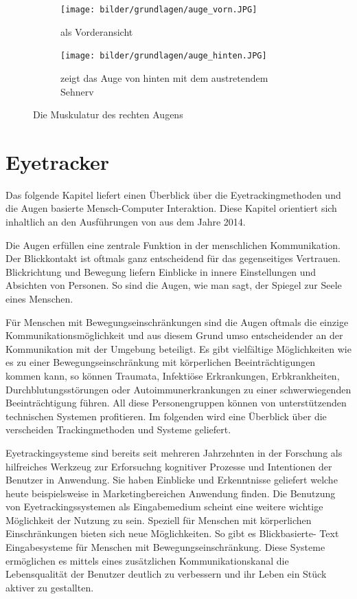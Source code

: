 \begin{figure}[ht]
    \centering
    \begin{subfigure}[t]{0.49\textwidth}
        \texttt{[image: bilder/grundlagen/auge\_vorn.JPG]}
        \caption{als Vorderansicht}
        \label{fig:augeVorne}
    \end{subfigure}
    \begin{subfigure}[t]{0.49\textwidth}
        \texttt{[image: bilder/grundlagen/auge\_hinten.JPG]}
        \caption{zeigt das Auge von hinten mit dem austretendem Sehnerv}
        \label{fig:augeHinten}
    \end{subfigure}
    \caption{Die Muskulatur des rechten Augens}\label{fig:rechtesAuge}
\end{figure}

\section{Eyetracker}
\label{section:eyetracker}
Das folgende Kapitel liefert einen Überblick über die Eyetrackingmethoden und die Augen basierte Mensch-Computer Interaktion. Diese Kapitel orientiert sich inhaltlich an den Ausführungen von \cite{Majaranta2014} aus dem Jahre 2014.

Die Augen erfüllen eine zentrale Funktion in der menschlichen Kommunikation. Der Blickkontakt ist oftmals ganz entscheidend für das gegenseitiges Vertrauen. Blickrichtung und Bewegung liefern Einblicke in innere Einstellungen und Absichten von Personen. So sind die Augen, wie man sagt, der Spiegel zur Seele eines Menschen. 

Für Menschen mit Bewegungseinschränkungen sind die Augen oftmals die einzige Kommunikationsmöglichkeit und aus diesem Grund umso entscheidender an der Kommunikation mit der Umgebung beteiligt. Es gibt vielfältige Möglichkeiten wie es zu einer Bewegungseinschränkung mit körperlichen Beeinträchtigungen kommen kann, so können Traumata, Infektiöse Erkrankungen, Erbkrankheiten, Durchblutungsstörungen oder Autoimmunerkrankungen zu einer schwerwiegenden Beeinträchtigung führen. All diese Personengruppen können von unterstützenden technischen Systemen profitieren. Im folgenden wird eine Überblick über die verscheiden Trackingmethoden und Systeme geliefert.


Eyetrackingsysteme sind bereits seit mehreren Jahrzehnten in der Forschung als hilfreiches Werkzeug zur Erforsuchng kognitiver Prozesse und Intentionen der Benutzer in Anwendung. Sie haben Einblicke und Erkenntnisse geliefert welche heute beispielsweise in Marketingbereichen Anwendung finden. Die Benutzung von Eyetrackingssystemen als Eingabemedium scheint eine weitere wichtige Möglichkeit der Nutzung zu sein. Speziell für Menschen mit körperlichen Einschränkungen bieten sich neue Möglichkeiten. So gibt es Blickbasierte- Text Eingabesysteme für Menschen mit Bewegungseinschränkung. Diese Systeme ermöglichen es mittels eines zusätzlichen Kommunikationskanal die Lebensqualität der Benutzer deutlich zu verbessern und ihr Leben ein Stück aktiver zu gestallten.


